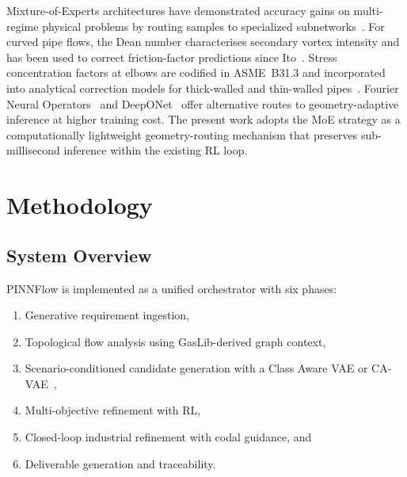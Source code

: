 \documentclass[conference]{IEEEtran}
\begin{document}
Mixture-of-Experts architectures have demonstrated accuracy gains on multi-regime physical problems by routing samples to specialized subnetworks~\cite{jacobs1991}. For curved pipe flows, the Dean number characterises secondary vortex intensity and has been used to correct friction-factor predictions since Ito~\cite{ito1959}. Stress concentration factors at elbows are codified in ASME~B31.3 and incorporated into analytical correction models for thick-walled and thin-walled pipes~\cite{ASME_B31_3}. Fourier Neural Operators~\cite{li2021fno} and DeepONet~\cite{lu2021} offer alternative routes to geometry-adaptive inference at higher training cost. The present work adopts the MoE strategy as a computationally lightweight geometry-routing mechanism that preserves sub-millisecond inference within the existing RL loop.
 
\section{Methodology}

\subsection{System Overview}

PINNFlow is implemented as a unified orchestrator with six phases:

\begin{enumerate}

\item Generative requirement ingestion,

\item Topological flow analysis using GasLib-derived graph context,

\item Scenario-conditioned candidate generation with a Class Aware VAE or CA-VAE~\cite{10219816},

\item Multi-objective refinement with RL,

\item Closed-loop industrial refinement with codal guidance, and

\item Deliverable generation and traceability.

\end{enumerate}
 
\end{document}
